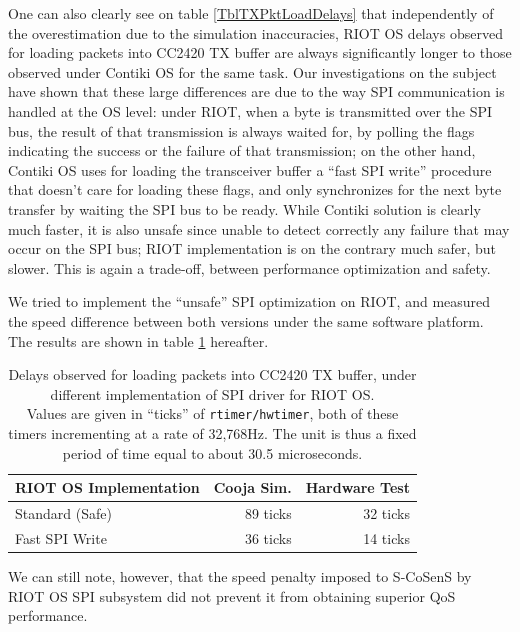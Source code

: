 \documentclass[conference]{IEEEtran}
\begin{document}
One can also clearly see on table \ref{TblTXPktLoadDelays} that independently
of the overestimation due to the simulation inaccuracies, RIOT OS delays
observed for loading packets into CC2420 TX buffer are always significantly
longer to those observed under Contiki OS for the same task.
Our investigations on the subject have shown that these large differences
are due to the way SPI communication is handled at the OS level: under RIOT,
when a byte is transmitted over the SPI bus, the result of that transmission
is always waited for, by polling the flags indicating the success or the
failure of that transmission; on the other hand, Contiki OS uses for loading
the transceiver buffer a ``fast SPI write'' procedure that doesn't care for
loading these flags, and only synchronizes for the next byte transfer by
waiting the SPI bus to be ready. While Contiki solution is clearly much
faster, it is also unsafe since unable to detect correctly any failure
that may occur on the SPI bus; RIOT implementation is on the contrary
much safer, but slower. This is again a trade-off, between performance
optimization and safety.

We tried to implement the ``unsafe'' SPI optimization on RIOT, and measured
the speed difference between both versions under the same software platform.
The results are shown in table \ref{TblRIOTLoadDelays} hereafter.

\begin{table}[!h]
\centering
\begin{tabular}{|l|r|r|}
\hline
RIOT OS Implementation &  Cooja Sim.  & Hardware Test \\
\hline
Standard (Safe)        &   89 ticks   &  32 ticks \\ 
Fast SPI Write         &   36 ticks   &  14 ticks \\
\hline
\end{tabular}
\caption{Delays observed for loading packets into CC2420 TX buffer, under
different implementation of SPI driver for RIOT OS.\\
Values are given in ``ticks'' of \texttt{rtimer/hwtimer}, both of these
timers incrementing at a rate of 32,768Hz. The unit is thus a fixed period
of time equal to about 30.5 microseconds.}
\label{TblRIOTLoadDelays}
\end{table}

We can still note, however, that the speed penalty imposed to S-CoSenS by
RIOT OS SPI subsystem did not prevent it from obtaining superior QoS
performance.

\end{document}
